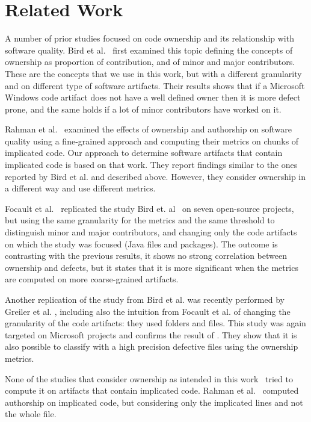 \section{Related Work}

A number of prior studies focused on code ownership and its relationship with software quality. 
Bird et al.~\cite{bird:original} first examined this topic defining the concepts of ownership as proportion of contribution, and of minor and major contributors. These are the concepts that we use in this work, but with a different granularity and on different type of software artifacts. Their results shows that if a Microsoft Windows code artifact does not have a well defined owner then it is more defect prone, and the same holds if a lot of minor contributors have worked on it. 

Rahman et al.~\cite{Rahman:blame} examined the effects of ownership and authorship on software quality using a fine-grained approach and computing their metrics on chunks of implicated code. Our approach to determine software artifacts that contain implicated code is based on that work. They report findings similar to the ones reported by Bird et al. and described above. However, they consider ownership in a different way and use different metrics.

Focault et al.~\cite{Foucault:oss} replicated the study Bird et. al~\cite{bird:original} on seven open-source projects, but using the same granularity for the metrics and the same threshold to distinguish minor and major contributors, and changing only the code artifacts on which the study was focused (Java files and packages). The outcome is contrasting with the previous results, it shows no strong correlation between ownership and defects, but it states that it is more significant when the metrics are computed on more coarse-grained artifacts.

Another replication of the study from Bird et al. was recently performed by Greiler et al. \cite{Greiler:replication}, including also the intuition from Focault et al. of changing the granularity of the code artifacts: they used folders and files. This study was again targeted on Microsoft projects and confirms the result of \cite{bird:original}. They show that it is also possible to classify with a high precision defective files using the ownership metrics.

None of the studies that consider ownership as intended in this work~ \cite{bird:original, Foucault:oss, Greiler:replication} tried to compute it on artifacts that contain implicated code. Rahman et al.~\cite{Rahman:blame} computed authorship on implicated code, but considering only the implicated lines and not the whole file.

